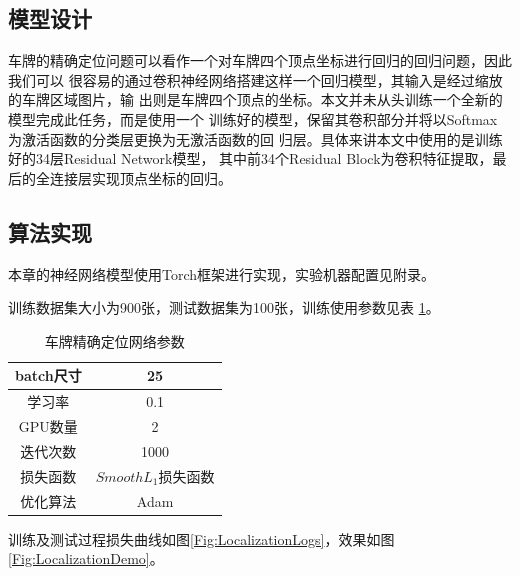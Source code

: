 \subsection{模型设计}

车牌的精确定位问题可以看作一个对车牌四个顶点坐标进行回归的回归问题，因此我们可以
很容易的通过卷积神经网络搭建这样一个回归模型，其输入是经过缩放的车牌区域图片，输
出则是车牌四个顶点的坐标。本文并未从头训练一个全新的模型完成此任务，而是使用一个
训练好的模型，保留其卷积部分并将以Softmax 为激活函数的分类层更换为无激活函数的回
归层。具体来讲本文中使用的是训练好的34层Residual Network\cite{He:2015tt}模型，
其中前34个Residual Block为卷积特征提取，最后的全连接层实现顶点坐标的回归。

\subsection{算法实现}

本章的神经网络模型使用Torch框架进行实现，实验机器配置见附录。

训练数据集大小为900张，测试数据集为100张，训练使用参数见表 \ref{Tab:LocationArgs}。

\begin{table}[ht]
\centering
\caption{车牌精确定位网络参数}\label{Tab:LocationArgs}
\begin{tabular}{|c|c|}
\hline
batch尺寸 & 25 \\
\hline
学习率 & 0.1 \\
\hline
GPU数量 & 2 \\
\hline
迭代次数 & 1000 \\
\hline
损失函数 & $Smooth L_1$损失函数 \\
\hline
优化算法 & Adam\cite{Kingma:2014us} \\
\hline
\end{tabular}
\end{table}

训练及测试过程损失曲线如图\ref{Fig:LocalizationLogs}，效果如图\ref{Fig:LocalizationDemo}。

